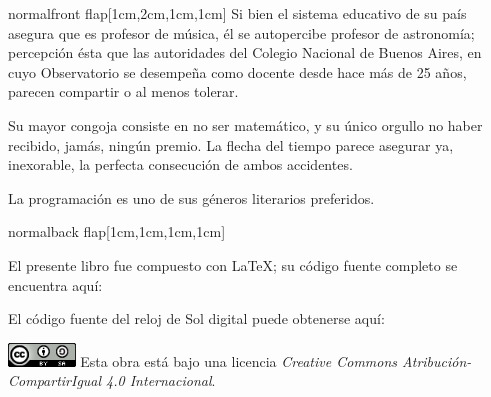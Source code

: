 \documentclass[coverwidth=148mm, coverheight=210mm, spinewidth=30mm,
flapwidth=7cm, wrapwidth=5mm, 11pt]{bookcover}
\begin{document}
\begin{bookcover}
\begin{bookcoverelement}{normal}{front flap}[1cm,2cm,1cm,1cm]
    \hspace{.5em} Si bien el sistema educativo de su país asegura que
    es profesor de música, él se autopercibe profesor de astronomía;
    percepción ésta que las autoridades del Colegio Nacional de Buenos
    Aires, en cuyo Observatorio se desempeña como docente desde hace
    más de 25 años, parecen compartir o al menos tolerar.

    \hspace{.5em} Su mayor congoja consiste en no ser
    matemático, y su único orgullo no haber recibido, jamás, ningún
    premio. La flecha del tiempo parece asegurar ya, inexorable, la
    perfecta consecución de ambos accidentes.

    \hspace{.5em} La programación es uno de sus géneros literarios
    preferidos.

  \end{bookcoverelement}

  \begin{bookcoverelement}{normal}{back flap}[1cm,1cm,1cm,1cm]

        El presente libro fue compuesto con \LaTeX; su código fuente
    completo se encuentra aquí:

    \begin{center}
      \colorbox{white}{%
        }
    \end{center}

    \bigskip
    
    El código fuente del reloj de Sol digital puede obtenerse aquí:

    \begin{center}
      \colorbox{white}{%
        }
    \end{center}

    
    \vfill


    \includegraphics[height=1.7em]{../cc-88x31} Esta obra está ba\-jo una
    licencia \emph{Creative Commons Atribución-CompartirIgual 4.0
      Internacional}.

    \begin{center}
      \colorbox{white}{%
        }
    \end{center}



\end{bookcoverelement}
\end{bookcover}
\end{document}
